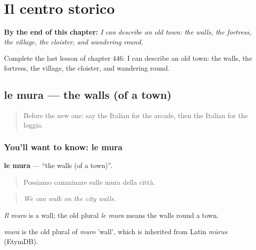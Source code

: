 
\chapter{Il centro storico}
\label{ch:it-il-centro-storico}

\begin{chapteropening}
\textbf{By the end of this chapter:} \emph{I can describe an old town: the walls, the fortress, the village, the cloister, and wandering round.}

Complete the last lesson of chapter 446: I can describe an old town: the walls, the fortress, the village, the cloister, and wandering round.
\end{chapteropening}

\section[le mura]{le mura — the walls (of a town)}

\label{lesson:IT-C446-mura}



\begin{quote}
Before the new one: say the Italian for the arcade, then the Italian for the loggia.
\end{quote}

\subsection*{You'll want to know: le mura}
\textbf{le mura} — \textquotedblleft{}the walls (of a town)\textquotedblright{}.

\begin{quote}
Possiamo camminare sulle mura della città.
\end{quote}

\begin{quote}
\emph{We can walk on the city walls.}
\end{quote}

\emph{Il muro} is a wall; the old plural \emph{le mura} means the walls round a town.

\begin{cousinweb}
\emph{mura} is the old plural of \emph{muro} 'wall', which is inherited from Latin \emph{mūrus} (EtymDB).
\end{cousinweb}

